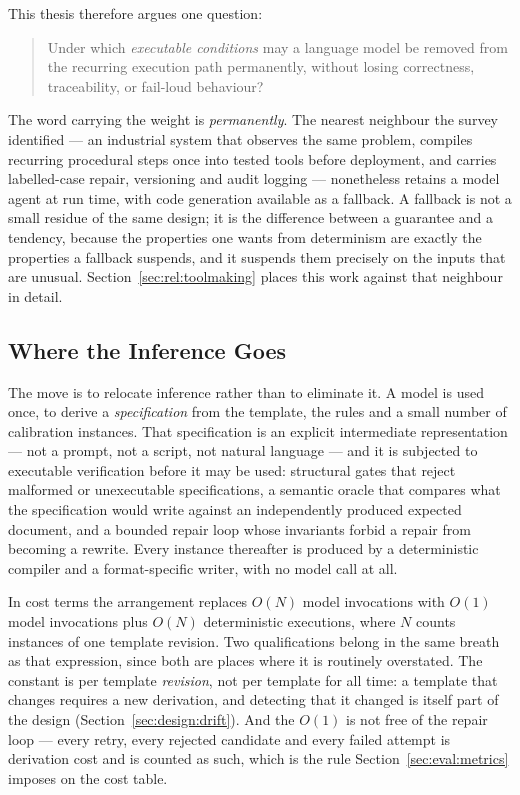 This thesis therefore argues one question:

\begin{quote}
Under which \emph{executable conditions} may a language model be removed from the recurring
execution path permanently, without losing correctness, traceability, or fail-loud
behaviour?
\end{quote}

The word carrying the weight is \emph{permanently}. The nearest neighbour the survey
identified --- an industrial system that observes the same problem, compiles recurring
procedural steps once into tested tools before deployment, and carries labelled-case repair,
versioning and audit logging --- nonetheless retains a model agent at run time, with code
generation available as a fallback. A fallback is not a small residue of the same design; it
is the difference between a guarantee and a tendency, because the properties one wants from
determinism are exactly the properties a fallback suspends, and it suspends them precisely
on the inputs that are unusual. Section~\ref{sec:rel:toolmaking} places this work against
that neighbour in detail.

\subsection{Where the Inference Goes}
\label{sec:intro:position:move}

The move is to relocate inference rather than to eliminate it. A model is used once, to
derive a \emph{specification} from the template, the rules and a small number of calibration
instances. That specification is an explicit intermediate representation --- not a prompt,
not a script, not natural language --- and it is subjected to executable verification before
it may be used: structural gates that reject malformed or unexecutable specifications, a
semantic oracle that compares what the specification would write against an independently
produced expected document, and a bounded repair loop whose invariants forbid a repair from
becoming a rewrite. Every instance thereafter is produced by a deterministic compiler and a
format-specific writer, with no model call at all.

In cost terms the arrangement replaces $O(N)$ model invocations with $O(1)$ model invocations
plus $O(N)$ deterministic executions, where $N$ counts instances of one template revision.
Two qualifications belong in the same breath as that expression, since both are places where
it is routinely overstated. The constant is per template \emph{revision}, not per template
for all time: a template that changes requires a new derivation, and detecting that it
changed is itself part of the design (Section~\ref{sec:design:drift}). And the $O(1)$ is not
free of the repair loop --- every retry, every rejected candidate and every failed attempt is
derivation cost and is counted as such, which is the rule Section~\ref{sec:eval:metrics}
imposes on the cost table.

